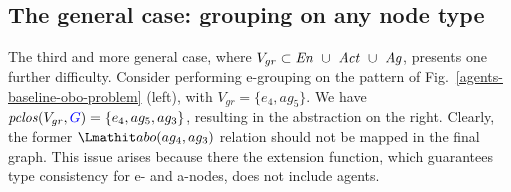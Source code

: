 %
%
%
%
%
%
%
%
%


\subsection{The general case: grouping on any node type}

The third and more general case, where \mbox{$V_{gr} \subset \mathit{En} ~\cup~ \mathit{Act} ~\cup~ \mathit{Ag}$}, presents one further  difficulty. Consider performing e-grouping on the pattern of Fig.~\ref{agents-baseline-obo-problem} (left), with \mbox{$V_{gr} = \{ e_4, ag_5 \}$}.
%
We have \mbox{$\clos(V_{gr}, \jwb{G}) = \{ e_4, ag_5, ag_3 \}$}, resulting in the abstraction on the right.
%
Clearly, the former $\delegate(ag_4, ag_3)$ relation should not be mapped in the final graph. 
%
This issue arises because there the extension function, which guarantees type consistency for e- and a-nodes, does not include agents. 
%

